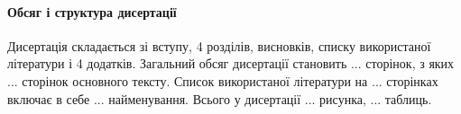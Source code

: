 \paragraph{Обсяг і структура дисертації}

Дисертація складається зі вступу, 4 розділів, висновків, списку використаної 
літератури і 4 додатків. Загальний обсяг дисертації становить ... сторінок, з 
яких ... сторінок основного тексту. Список використаної літератури на ... 
сторінках включає в себе ... найменування. Всього у дисертації ... рисунка, 
... таблиць.








